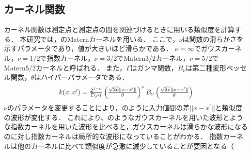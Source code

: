 \documentclass[twocolumn]{ltjarticle}
\begin{document}
\subsection{カーネル関数}

カーネル関数は測定点と測定点の間を関連づけるときに用いる類似度を計算する．
本研究では，のMaternカーネルを用いる．
ここで，\(\nu\)は関数の滑らかさを示すパラメータであり，値が大きいほど滑らかである．
\(\nu=\infty\)でガウスカーネル，\(\nu=1/2\)で指数カーネル，\(\nu=3/2\)でMatern3/2カーネル，\(\nu=5/2\)でMatern5/2カーネルと呼ばれる．
また，\(\Gamma\)はガンマ関数，\(B_{\nu}\)は第二種変形ベッセル関数，\(\theta\)はハイパーパラメータである．
\begin{align}
	\scalebox{1.0}{
		\(
		k(x, x^{\prime}) = \frac{2^{1-\nu}}{\Gamma (\nu)}\left(\frac{\sqrt{2\nu}\Vert x - x^{\prime} \Vert}{\theta}\right)^{\nu} B_{\nu} \left(\frac{\sqrt{2 \nu} \Vert x - x^{\prime} \Vert}{\theta}\right) \label{eq:matern}
		\)
	}
\end{align}
\(\nu\)のパラメータを変更することにより，のように入力値間の差\(||x-x^{\prime}||\)と類似度の波形が変化する．
これにより、のようなガウスカーネルを用いた波形とような指数カーネルを用いた波形を比べると，ガウスカーネルは滑らかな波形になるのに対し指数カーネルは局所的な波形になっていることがわかる．
指数カーネルは他のカーネルに比べて類似度が急激に減少していることが要因となる（
\setlength\intextsep{6pt}
\setlength\textfloatsep{6pt}
\end{document}
